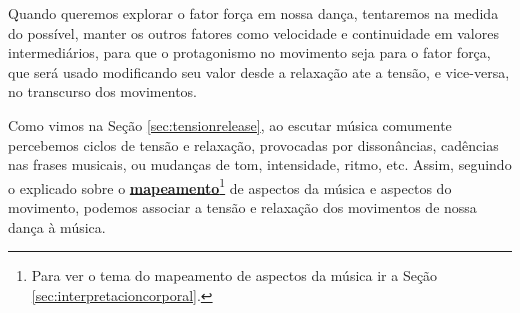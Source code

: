 Quando queremos explorar o fator força em nossa dança, tentaremos na medida do possível,
manter os outros fatores como velocidade e continuidade em valores intermediários,
para que o protagonismo no movimento seja para o fator força,
que será usado modificando seu valor desde a relaxação ate a tensão, e vice-versa, no transcurso dos movimentos. 

Como vimos na Seção \ref{sec:tensionrelease}, 
ao escutar música comumente percebemos ciclos de tensão e relaxação,
provocadas por dissonâncias,  cadências nas frases musicais, ou mudanças de
tom, intensidade, ritmo, etc.
Assim, 
seguindo o explicado sobre o \hyperref[sec:interpretacioncorporal]{\textbf{mapeamento}}\footnote{Para
ver o tema do mapeamento de aspectos da música ir a Seção \ref{sec:interpretacioncorporal}.} 
de aspectos da música e aspectos do movimento,
podemos associar a tensão e relaxação dos movimentos de nossa dança à música.



